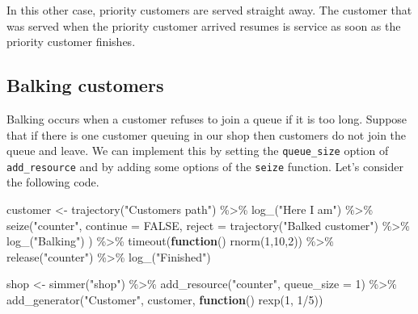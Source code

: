 \documentclass[
]{book}
\newenvironment{Shaded}{\begin{snugshade}}{\end{snugshade}}
\newcommand{\AttributeTok}[1]{\textcolor[rgb]{0.77,0.63,0.00}{#1}}
\newcommand{\ConstantTok}[1]{\textcolor[rgb]{0.00,0.00,0.00}{#1}}
\newcommand{\ControlFlowTok}[1]{\textcolor[rgb]{0.13,0.29,0.53}{\textbf{#1}}}
\newcommand{\DecValTok}[1]{\textcolor[rgb]{0.00,0.00,0.81}{#1}}
\newcommand{\FunctionTok}[1]{\textcolor[rgb]{0.00,0.00,0.00}{#1}}
\newcommand{\NormalTok}[1]{#1}
\newcommand{\OtherTok}[1]{\textcolor[rgb]{0.56,0.35,0.01}{#1}}
\newcommand{\SpecialCharTok}[1]{\textcolor[rgb]{0.00,0.00,0.00}{#1}}
\newcommand{\StringTok}[1]{\textcolor[rgb]{0.31,0.60,0.02}{#1}}
\begin{document}
In this other case, priority customers are served straight away. The customer that was served when the priority customer arrived resumes is service as soon as the priority customer finishes.

\hypertarget{balking-customers}{%
\subsection{Balking customers}\label{balking-customers}}

Balking occurs when a customer refuses to join a queue if it is too long. Suppose that if there is one customer queuing in our shop then customers do not join the queue and leave. We can implement this by setting the \texttt{queue\_size} option of \texttt{add\_resource} and by adding some options of the \texttt{seize} function. Let's consider the following code.

\begin{Shaded}
\begin{Highlighting}[]
\NormalTok{customer }\OtherTok{\textless{}{-}}
  \FunctionTok{trajectory}\NormalTok{(}\StringTok{"Customer\textquotesingle{}s path"}\NormalTok{) }\SpecialCharTok{\%\textgreater{}\%}
  \FunctionTok{log\_}\NormalTok{(}\StringTok{"Here I am"}\NormalTok{) }\SpecialCharTok{\%\textgreater{}\%}
  \FunctionTok{seize}\NormalTok{(}\StringTok{"counter"}\NormalTok{, }\AttributeTok{continue =} \ConstantTok{FALSE}\NormalTok{, }\AttributeTok{reject =} 
          \FunctionTok{trajectory}\NormalTok{(}\StringTok{"Balked customer"}\NormalTok{) }\SpecialCharTok{\%\textgreater{}\%} \FunctionTok{log\_}\NormalTok{(}\StringTok{"Balking"}\NormalTok{) ) }\SpecialCharTok{\%\textgreater{}\%}
  \FunctionTok{timeout}\NormalTok{(}\ControlFlowTok{function}\NormalTok{() }\FunctionTok{rnorm}\NormalTok{(}\DecValTok{1}\NormalTok{,}\DecValTok{10}\NormalTok{,}\DecValTok{2}\NormalTok{)) }\SpecialCharTok{\%\textgreater{}\%}
  \FunctionTok{release}\NormalTok{(}\StringTok{"counter"}\NormalTok{) }\SpecialCharTok{\%\textgreater{}\%}
   \FunctionTok{log\_}\NormalTok{(}\StringTok{"Finished"}\NormalTok{)}

\NormalTok{shop }\OtherTok{\textless{}{-}}
  \FunctionTok{simmer}\NormalTok{(}\StringTok{"shop"}\NormalTok{) }\SpecialCharTok{\%\textgreater{}\%}
  \FunctionTok{add\_resource}\NormalTok{(}\StringTok{"counter"}\NormalTok{, }\AttributeTok{queue\_size =} \DecValTok{1}\NormalTok{) }\SpecialCharTok{\%\textgreater{}\%}
  \FunctionTok{add\_generator}\NormalTok{(}\StringTok{"Customer"}\NormalTok{, customer,}
                \ControlFlowTok{function}\NormalTok{() }\FunctionTok{rexp}\NormalTok{(}\DecValTok{1}\NormalTok{, }\DecValTok{1}\SpecialCharTok{/}\DecValTok{5}\NormalTok{))}
\end{Highlighting}
\end{Shaded}
\end{document}

